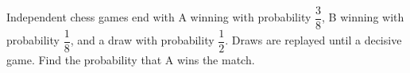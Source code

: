 Independent chess games end with A winning with probability $\dfrac{3}{8}$, B winning with probability $\dfrac{1}{8}$, and a draw with probability $\dfrac{1}{2}$. Draws are replayed until a decisive game. Find the probability that A wins the match.
